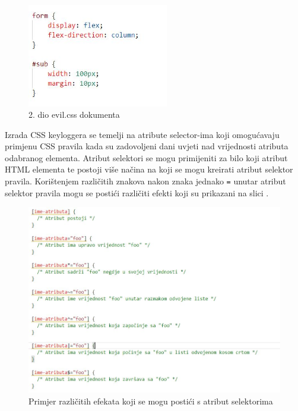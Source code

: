 \documentclass[12pt, oneside, onecolumn]{book}
\begin{document}
{\begin{figure}[H]
	\begin{center}
		\includegraphics[width=0.55\textwidth]{css_evil2.jpg}
		\caption{2. dio evil.css dokumenta} \label{fig:css_evil2}
	\end{center}
\end{figure}

Izrada CSS keyloggera se temelji na atribute selector-ima koji omogućavaju primjenu CSS pravila kada su zadovoljeni dani uvjeti nad vrijednosti atributa odabranog elementa. Atribut selektori se mogu primijeniti za bilo koji atribut HTML elementa te postoji više načina na koji se mogu kreirati atribut selektor pravila. Korištenjem različitih znakova nakon znaka jednako \texttt{=} unutar atribut selektor pravila mogu se postići različiti efekti koji su prikazani na slici .

\begin{figure}[H]
	\begin{center}
		\includegraphics[width=\textwidth]{css_ate.jpg}
		\caption{Primjer različitih efekata koji se mogu postići s atribut selektorima} \label{fig:css_ate}
	\end{center}
\end{figure}

}
\end{document}
